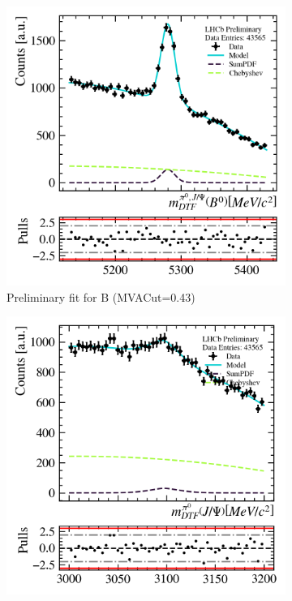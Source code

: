 \begin{figure}
    \begin{subfigure}{0.49\textwidth}
        \includegraphics[width=\textwidth]{./OutputFiles/PNGPlots/PreliminaryFit/MVAScan/b1dfit_mva0.43_jpsichannel.png}
        \caption*{Preliminary fit for B (MVACut=0.43)}
        \label{fig:prefit_mvascan_mvacut040_b}
    \end{subfigure}
    \begin{subfigure}{0.49\textwidth}
        \includegraphics[width=\textwidth]{./OutputFiles/PNGPlots/PreliminaryFit/MVAScan/jpsi1dfit_mva0.43_jpsichannel.png}

\end{subfigure}
\end{figure}
